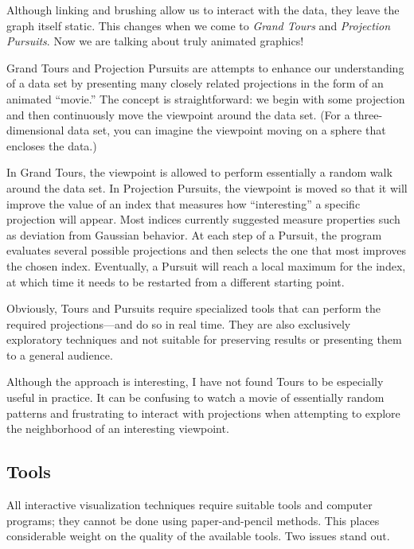 Although linking and brushing allow us to interact with the data, they
leave the graph itself static. This changes when we come to
\emph{Grand Tours} and \emph{Projection Pursuits}. Now we are talking
about truly animated graphics!

Grand Tours and Projection Pursuits are attempts to enhance our
understanding of a data set by presenting many closely related\vadjust{\pagebreak}
projections in the form of an animated ``movie.'' The concept is
straightforward: we begin with some projection and then continuously
move the viewpoint around the data set. (For a three-dimensional data
set, you can imagine the viewpoint moving on a sphere that encloses
the data.)

In Grand Tours, the viewpoint is allowed to perform essentially a
random walk around the data set. In Projection Pursuits, the viewpoint
is moved so that it will improve the value of an index that measures
how ``interesting'' a specific projection will appear.  Most indices
currently suggested measure properties such as deviation from Gaussian
behavior. At each step of a Pursuit, the program evaluates several
possible projections and then selects the one that most improves the
chosen index. Eventually, a Pursuit will reach a local maximum for the
index, at which time it needs to be restarted from a different
starting point.

Obviously, Tours and Pursuits require specialized tools that can
perform the required projections---and do so in real time.  They are
also exclusively exploratory techniques and not suitable for
preserving results or presenting them to a general audience.

Although the approach is interesting, I have not found Tours to be
especially useful in practice. It can be confusing to watch a movie of
essentially random patterns and frustrating to interact with
projections when attempting to explore the neighborhood of an
interesting viewpoint.

\vspace*{-9pt}
\subsection{Tools}

 
All interactive visualization techniques require suitable tools and
computer programs; they cannot be done using paper-and-pencil methods.
This places considerable weight on the quality of the available tools.
Two issues stand out.

